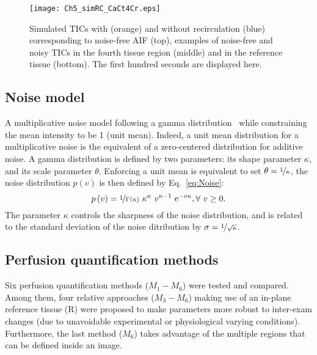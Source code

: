 \begin{figure}
\texttt{[image: Ch5\_simRC\_CaCt4Cr.eps]}
\vspace{-5mm}
\caption{Simulated TICs with (orange) and without recirculation (blue) corresponding to noise-free AIF (top), examples of noise-free and noisy TICs in the fourth tissue region (middle) and in the reference tissue (bottom). The first hundred seconds are displayed here.}
\label{fig:recmod}
\vspace{-3mm}
\end{figure}

\subsection{Noise model}
A multiplicative noise model following a gamma distribution~\cite{Barrois2013} while constraining the mean intensity to be 1 (unit mean). Indeed, a unit mean distribution for a multiplicative noise is the equivalent of a zero-centered distribution for additive noise. A gamma distribution is defined by two parameters: its shape parameter $\kappa$, and its scale parameter $\theta$. Enforcing a unit mean is equivalent to set $\theta = \nicefrac{1}{\kappa}$, the noise distribution $p\left(v\right)$ is then defined by Eq.~\ref{eq:Noise}:
\begin{equation}
p\left(v\right) = \nicefrac{1}{\Gamma\left(\kappa\right)} ~ \kappa^\kappa ~ v^{\kappa-1} ~ \mathrm e^{-v\kappa}, \forall~v \geq 0.
\label{eq:Noise}
\end{equation}
The parameter $\kappa$ controls the sharpness of the noise distribution, and is related to the standard deviation of the noise ditribution by $\sigma = \nicefrac{1}{\sqrt{\kappa}}$.

\subsection{Perfusion quantification methods}
\label{sec:Models}
Six perfusion quantification methods ($M_1-M_6$) were tested and compared. Among them, four relative approaches ($M_3-M_6$) making use of an in-plane reference tissue (R) were proposed to make parameters more robust to inter-exam changes (due to unavoidable experimental or physiological varying conditions). Furthermore, the last method ($M_6$) takes advantage of the multiple regions that can be defined inside an image.

